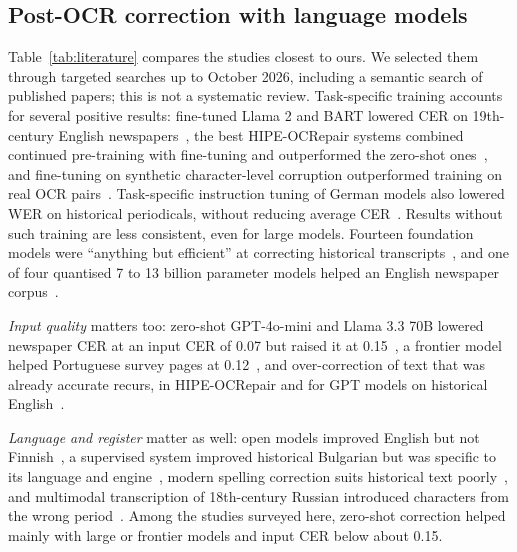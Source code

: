 \documentclass[conference]{IEEEtran}
\begin{document}
\subsection{Post-OCR correction with language models}
Table~\ref{tab:literature} compares the studies closest to ours. We selected them through targeted searches up to October 2026, including a semantic search of published papers; this is not a systematic review. Task-specific training accounts for several positive results: fine-tuned Llama 2 and BART lowered CER on 19th-century English newspapers~\cite{thomas2024leveraging}, the best HIPE-OCRepair systems combined continued pre-training with fine-tuning and outperformed the zero-shot ones~\cite{ehrmann2026hipeocrepair}, and fine-tuning on synthetic character-level corruption outperformed training on real OCR pairs~\cite{bourne2025scrambled}. Task-specific instruction tuning of German models also lowered WER on historical periodicals, without reducing average CER~\cite{danilova2025german}. Results without such training are less consistent, even for large models. Fourteen foundation models were ``anything but efficient'' at correcting historical transcripts~\cite{boros2024postcorrection}, and one of four quantised 7 to 13 billion parameter models helped an English newspaper corpus~\cite{vershinin2025lightweight}.

\emph{Input quality} matters too: zero-shot GPT-4o-mini and Llama 3.3 70B lowered newspaper CER at an input CER of 0.07 but raised it at 0.15~\cite{koynov2025opportunities}, a frontier model helped Portuguese survey pages at 0.12~\cite{viana2026reframing}, and over-correction of text that was already accurate recurs, in HIPE-OCRepair and for GPT models on historical English~\cite{zhang2024prosody}.

\emph{Language and register} matter as well: open models improved English but not Finnish~\cite{kanerva2025nofreelunches}, a supervised system improved historical Bulgarian but was specific to its language and engine~\cite{beshirov2025bulgarian}, modern spelling correction suits historical text poorly~\cite{do2025reference}, and multimodal transcription of 18th-century Russian introduced characters from the wrong period~\cite{levchenko2025historical}. Among the studies surveyed here, zero-shot correction helped mainly with large or frontier models and input CER below about 0.15.
\end{document}
